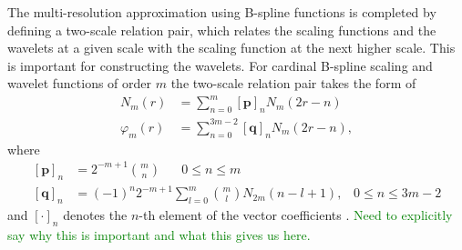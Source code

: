 \documentclass[review,authoryear,3p]{elsarticle}
\newcommand{\dean}[1]{\textcolor{green}{#1}}
\begin{document}
The multi-resolution approximation using B-spline functions is completed by defining a two-scale relation pair, which relates the scaling functions and the wavelets at a given scale with the scaling function at the next higher scale. This is important for constructing the wavelets. For cardinal B-spline scaling and wavelet functions of order $m$ the two-scale relation pair takes the form of
\begin{align}
 N_{m}\left(r\right)&=\sum_{n=0}^{m} \left[\mathbf p\right]_n N_{m}\left(2r-n\right) \label{eq:MRA-TwoScalepair1} \\
  \varphi_{m}\left(r\right) &= \sum_{n=0}^{3m-2}  \left[\mathbf q\right]_n N_{m}\left(2r-n\right)\label{eq:MRA-TwoScalepair2},
 \end{align}
where 
 \begin{align}
\left[\mathbf p\right]_n&=2^{-m+1} \binom{m}{n} \quad \text{ $0\le n\le m$} \label{eq:MRA-TwoScalepair1coefs}\\
\left[\mathbf q\right]_n&= \left(-1\right)^n{2^{-m+1}}\sum_{l=0}^{m} \binom{m}{l} N_{2m}\left(n-l+1\right), \,  \text{ $0\le n\le 3m-2$}\label{eq:MRA-TwoScalepair2coefs}
 \end{align}
and $\left[\cdot\right]_n$ denotes the $n$-th element of the vector coefficients \citep{Chui1992}. \dean{Need to explicitly say why this is important and what this gives us here.}
\end{document}

